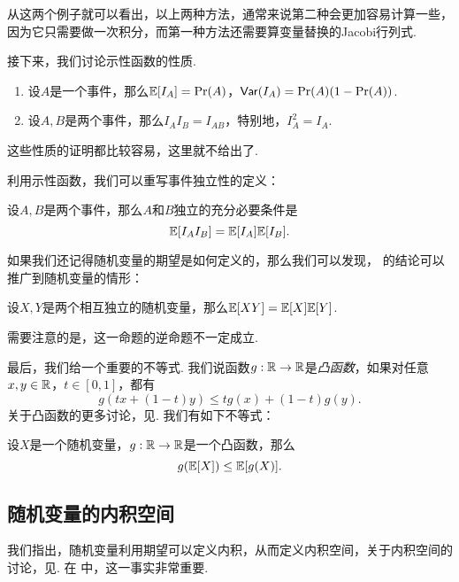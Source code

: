 从这两个例子就可以看出，以上两种方法，通常来说第二种会更加容易计算一些，因为它只需要做一次积分，而第一种方法还需要算变量替换的Jacobi行列式. 

接下来，我们讨论示性函数的性质. 

\begin{proposition}\label{prop:expectation-indicator}
\begin{enumerate}
    \item 设$A$是一个事件，那么$\mathbb{E}[I_A]=\Pr(A)$，$\mathsf{Var}(I_A)=\Pr(A)(1-\Pr(A))$.
    \item 设$A,B$是两个事件，那么$I_AI_B=I_{AB}$，特别地，$I_A^2=I_A$.
\end{enumerate}
\end{proposition}
这些性质的证明都比较容易，这里就不给出了. 

利用示性函数，我们可以重写事件独立性的定义：

\begin{proposition}\label{prop:independent-expectation}
设$A,B$是两个事件，那么$A$和$B$独立的充分必要条件是
\[\mathbb{E}[I_AI_B]=\mathbb{E}[I_A]\mathbb{E}[I_B].\]
\end{proposition}

如果我们还记得随机变量的期望是如何定义的，那么我们可以发现， 的结论可以推广到随机变量的情形：

\begin{theorem}\label{thm:independent-expectation-2}
设$X,Y$是两个相互独立的随机变量，那么$\mathbb{E}[XY]=\mathbb{E}[X]\mathbb{E}[Y]$. 
\end{theorem}

需要注意的是，这一命题的逆命题不一定成立. 

最后，我们给一个重要的不等式. 我们说函数$g:\mathbb{R}\to\mathbb{R}$是\emph{凸函数}，如果对任意$x,y\in\mathbb{R}$，$t\in[0,1]$，都有
\[g(tx+(1-t)y)\leq tg(x)+(1-t)g(y).\]
关于凸函数的更多讨论，见. 我们有如下不等式：

\begin{theorem}[Jensen不等式]\label{thm:jensen}
设$X$是一个随机变量，$g:\mathbb{R}\to\mathbb{R}$是一个凸函数，那么
\[g(\mathbb{E}[X])\leq \mathbb{E}[g(X)].\]
\end{theorem}

\subsection{随机变量的内积空间}\label{subsec:inner-product}

我们指出，随机变量利用期望可以定义内积，从而定义内积空间，关于内积空间的讨论，见. 在 中，这一事实非常重要. 

